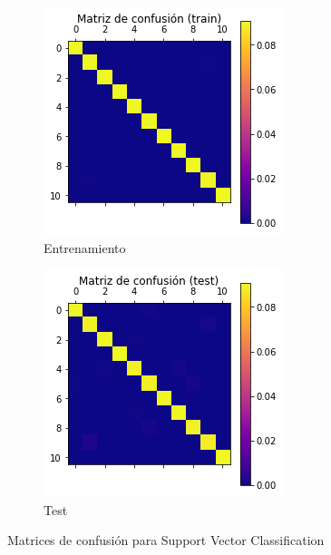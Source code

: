 \documentclass[10pt,a4paper]{article}
\begin{document}
\begin{figure}[h]
	\begin{subfigure}{0.5\textwidth}
		\centering
		\includegraphics[width=\textwidth]{cla_confusion_svc_train}
		\caption{Entrenamiento}
	\end{subfigure}
	\begin{subfigure}{0.5\textwidth}
		\centering
		\includegraphics[width=\textwidth]{cla_confusion_svc_test}
		\caption{Test}
	\end{subfigure}
	\caption{Matrices de confusión para Support Vector Classification}
	\label{fig:cla_confusion_svc}
\end{figure}
\end{document}
